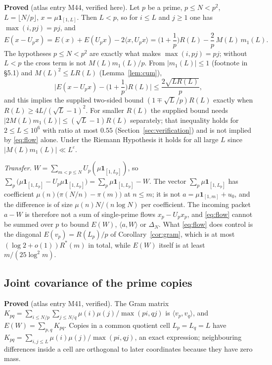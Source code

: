 \documentclass[11pt]{article}
\theoremstyle{definition}
\theoremstyle{remark}
\newcommand{\ip}[2]{\langle #1,#2\rangle}
\newcommand{\Rstar}{R^{*}}
\begin{document}
\textbf{Proved} (atlas entry M44, verified here). Let $p$ be a prime, $p\le N<p^2$, $L=\lfloor N/p\rfloor$, $x=\mu\mathbf 1_{[1,L]}$. Then $L<p$, so for $i\le L$ and $j\ge1$ one has $\max(i,pj)=pj$, and
\begin{equation}\label{eq:flow}
E(x-U_px)=E(x)+E(U_px)-2\ip x{U_px}=\Big(1+\frac1p\Big)R(L)-\frac2p\,M(L)\,m_1(L).
\end{equation}
The hypotheses $p\le N<p^2$ are exactly what makes $\max(i,pj)=pj$; without $L<p$ the cross term is not $M(L)m_1(L)/p$. From $|m_1(L)|\le1$ (footnote in \S5.1) and $M(L)^2\le LR(L)$ (Lemma~\ref{lem:cum}),
\[
\Big|E(x-U_px)-\Big(1+\frac1p\Big)R(L)\Big|\le\frac{2\sqrt{LR(L)}}p ,
\]
and this implies the supplied two-sided bound $(1\mp\sqrt L/p)R(L)$ exactly when $R(L)\ge4L/(\sqrt L-1)^2$. For smaller $R(L)$ the supplied bound needs $|2M(L)m_1(L)|\le(\sqrt L-1)R(L)$ separately; that inequality holds for $2\le L\le10^6$ with ratio at most $0.55$ (Section~\ref{sec:verification}) and is not implied by \eqref{eq:flow} alone. Under the Riemann Hypothesis it holds for all large $L$ since $|M(L)m_1(L)|\ll L^{\varepsilon}$.

\emph{Transfer.} $W=\sum_{m<p\le N}U_p(\mu\mathbf 1_{[1,L_p]})$, so $\sum_p\big(\mu\mathbf 1_{[1,L_p]}-U_p\mu\mathbf 1_{[1,L_p]}\big)=\sum_p\mu\mathbf 1_{[1,L_p]}-W$. The vector $\sum_p\mu\mathbf 1_{[1,L_p]}$ has coefficient $\mu(n)\big(\pi(N/n)-\pi(m)\big)$ at $n\le m$; it is not $a=\mu\mathbf 1_{[1,m]}+u_0$, and the difference is of size $\mu(n)N/(n\log N)$ per coefficient. The incoming packet $a-W$ is therefore not a sum of single-prime flows $x_p-U_px_p$, and \eqref{eq:flow} cannot be summed over $p$ to bound $E(W)$, $\ip aW$ or $\Delta_N$. What \eqref{eq:flow} does control is the diagonal $E(v_p)=R(L_p)/p$ of Corollary~\ref{cor:gram}, which is at most $(\log2+o(1))\Rstar(m)$ in total, while $E(W)$ itself is at least $m/(25\log^2m)$.

\subsection{Joint covariance of the prime copies}

\textbf{Proved} (atlas entry M41, verified). The Gram matrix $K_{pq}=\sum_{i\le N/p}\sum_{j\le N/q}\mu(i)\mu(j)/\max(pi,qj)$ is $\ip{v_p}{v_q}$, and $E(W)=\sum_{p,q}K_{pq}$. Copies in a common quotient cell $L_p=L_q=L$ have $K_{pq}=\sum_{i,j\le L}\mu(i)\mu(j)/\max(pi,qj)$, an exact expression; neighbouring differences inside a cell are orthogonal to later coordinates because they have zero mass.
\end{document}
